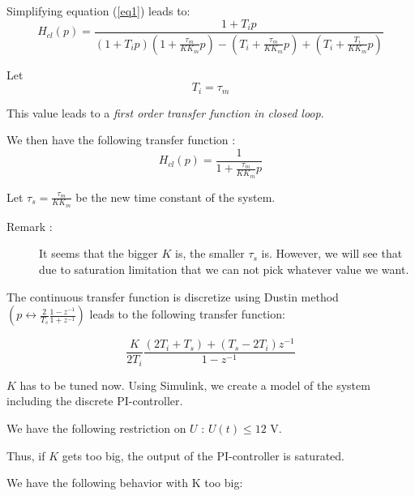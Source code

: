 Simplifying equation (\ref{eq1}) leads to: 
\begin{equation} \label{contTransfertPI} H_{cl}(p) = \frac{1 + T_i p}{(1+T_i p)(1+\frac{\tau_{m}}{K K_m} p) - (T_i + \frac{\tau_m}{K K_m}p) + (T_i + \frac{T_i}{K K_m}p)} \end{equation} 

Let \begin{equation} \label{valueTi} T_i = \tau_m \end{equation}

This value leads to a \emph{first order transfer function in closed loop}.

We then have the following transfer function : \begin{equation} H_{cl}(p) = \frac{1}{1 + \frac{\tau_m}{K K_m}p} \end{equation}

Let $\tau_{s} = \frac{\tau_m}{K K_m}$ be the new time constant of the system.

\begin{description} \item[Remark :] It seems that the bigger $K$ is, the smaller $\tau_{s}$ is. 
  However, we will see that due to saturation limitation that we can not pick whatever value we want. \end{description}

The continuous transfer function is discretize using Dustin method $\left(p \leftrightarrow \frac{2}{T_s} \frac{1-z^{-1}}{1 + z^{-1}}\right)$ leads to the following transfer function:

\begin{equation} \label{disTransferPI} \frac{K}{2 T_i} \frac{(2 T_i + T_s) + (T_s - 2 T_i) z^{-1} }{ 1 - z^{-1} } \end{equation}

$K$ has to be tuned now. Using Simulink, we create a model of the system including the discrete PI-controller. 

We have the following restriction on $U$ : $U(t) \leq 12 \text{ V}$.

Thus, if $K$ gets too big, the output of the PI-controller is saturated. 

We have the following behavior with K too big:

